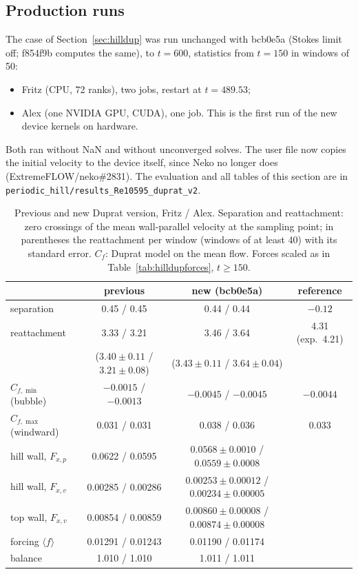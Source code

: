 \documentclass[11pt,a4paper]{article}
\newcommand{\code}[1]{\texttt{#1}}
\begin{document}
\subsection{Production runs}

The case of Section~\ref{sec:hilldup} was run unchanged with bcb0e5a
(Stokes limit off; f854f9b computes the same), to $t = 600$, statistics from
$t = 150$ in windows of 50:
\begin{itemize}
  \item Fritz (CPU, 72 ranks), two jobs, restart at $t = 489.53$;
  \item Alex (one NVIDIA GPU, CUDA), one job. This is the first run of the
    new device kernels on hardware.
\end{itemize}
Both ran without NaN and without unconverged solves. The user file now
copies the initial velocity to the device itself, since Neko no longer does
(ExtremeFLOW/neko\#2831). The evaluation and all tables of this section are
in \code{periodic\_hill/results\_Re10595\_duprat\_v2}.

\begin{table}[htbp]
\centering
\footnotesize
\setlength{\tabcolsep}{4pt}
\caption{Previous and new Duprat version, Fritz / Alex. Separation and
reattachment: zero crossings of the mean wall-parallel velocity at the
sampling point; in parentheses the reattachment per window (windows of at
least 40) with its standard error. $C_f$: Duprat model on the mean flow.
Forces scaled as in Table~\ref{tab:hilldupforces}, $t \ge 150$.}
\label{tab:dupv2}
\begin{tabular}{@{}lccc@{}}
\toprule
 & previous & new (bcb0e5a) & reference \\
\midrule
separation & 0.45 / 0.45 & 0.44 / 0.44 & $-0.12$ \\
reattachment & 3.33 / 3.21 & 3.46 / 3.64 & 4.31 (exp.\ 4.21) \\
 & ($3.40 \pm 0.11$ / $3.21 \pm 0.08$) & ($3.43 \pm 0.11$ / $3.64 \pm 0.04$) & \\
$C_{f,\min}$ (bubble) & $-0.0015$ / $-0.0013$ & $-0.0045$ / $-0.0045$ & $-0.0044$ \\
$C_{f,\max}$ (windward) & 0.031 / 0.031 & 0.038 / 0.036 & 0.033 \\
hill wall, $F_{x,p}$ & 0.0622 / 0.0595 & $0.0568 \pm 0.0010$ / $0.0559 \pm 0.0008$ & \\
hill wall, $F_{x,v}$ & 0.00285 / 0.00286 & $0.00253 \pm 0.00012$ / $0.00234 \pm 0.00005$ & \\
top wall, $F_{x,v}$ & 0.00854 / 0.00859 & $0.00860 \pm 0.00008$ / $0.00874 \pm 0.00008$ & \\
forcing $\langle f\rangle$ & 0.01291 / 0.01243 & 0.01190 / 0.01174 & \\
balance & 1.010 / 1.010 & 1.011 / 1.011 & \\
\bottomrule
\end{tabular}
\end{table}
\end{document}
